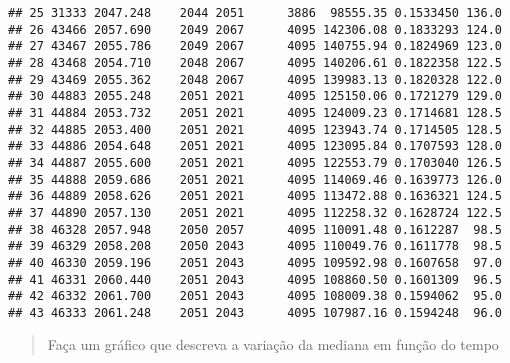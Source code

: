 \documentclass[
]{article}
\begin{document}
\begin{verbatim}
## 25 31333 2047.248    2044 2051      3886  98555.35 0.1533450 136.0
## 26 43466 2057.690    2049 2067      4095 142306.08 0.1833293 124.0
## 27 43467 2055.786    2049 2067      4095 140755.94 0.1824969 123.0
## 28 43468 2054.710    2048 2067      4095 140206.61 0.1822358 122.5
## 29 43469 2055.362    2048 2067      4095 139983.13 0.1820328 122.0
## 30 44883 2055.248    2051 2021      4095 125150.06 0.1721279 129.0
## 31 44884 2053.732    2051 2021      4095 124009.23 0.1714681 128.5
## 32 44885 2053.400    2051 2021      4095 123943.74 0.1714505 128.5
## 33 44886 2054.648    2051 2021      4095 123095.84 0.1707593 128.0
## 34 44887 2055.600    2051 2021      4095 122553.79 0.1703040 126.5
## 35 44888 2059.686    2051 2021      4095 114069.46 0.1639773 126.0
## 36 44889 2058.626    2051 2021      4095 113472.88 0.1636321 124.5
## 37 44890 2057.130    2051 2021      4095 112258.32 0.1628724 122.5
## 38 46328 2057.948    2050 2057      4095 110091.48 0.1612287  98.5
## 39 46329 2058.208    2050 2043      4095 110049.76 0.1611778  98.5
## 40 46330 2059.196    2051 2043      4095 109592.98 0.1607658  97.0
## 41 46331 2060.440    2051 2043      4095 108860.50 0.1601309  96.5
## 42 46332 2061.700    2051 2043      4095 108009.38 0.1594062  95.0
## 43 46333 2061.248    2051 2043      4095 107987.16 0.1594248  96.0
\end{verbatim}

\begin{quote}
Faça um gráfico que descreva a variação da mediana em função do tempo
\end{quote}
\end{document}
